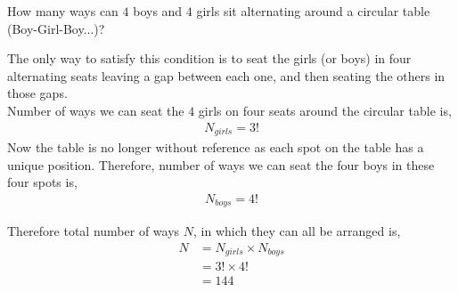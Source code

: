 
%
%
%
%
% 
% 

\question How many ways can $4$ boys and $4$ girls sit alternating around a circular table (Boy-Girl-Boy...)?

\insertQR{}

\ifprintanswers
\fi 

\begin{solution}
  The only way to satisfy this condition is to seat the girls (or boys) in four alternating seats leaving a gap between each one, and then seating the others in those gaps. \\
  Number of ways we can seat the $4$ girls on four seats around the circular table is,
  \begin{align}
    N_{girls} = 3!
  \end{align}
  Now the table is no longer without reference as each spot on the table has a unique position. Therefore, number of ways we can seat the four boys in these four spots is,
  \begin{align}
    N_{boys} = 4!
  \end{align}

  Therefore total number of ways $N$, in which they can all be arranged is,
    \begin{align}
      N &= N_{girls} \times N_{boys} \nonumber \\
        &= 3! \times 4! \nonumber \\
        &= 144
    \end{align}

\end{solution}

